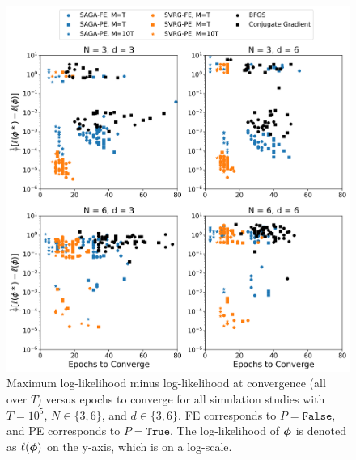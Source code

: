 \begin{figure}[h]
    \centering
    \includegraphics[width=5.5in]{../plt/scatter_sim_T_100000.png}
    \caption{Maximum log-likelihood minus log-likelihood at convergence (all over $T$) versus epochs to converge for all simulation studies with $T=10^{5}$, $N \in \{3,6\}$, and $d \in \{3,6\}$. FE corresponds to $P = \texttt{False}$, and PE corresponds to $P = \texttt{True}$.
    The log-likelihood of $\boldsymbol{\phi}$ is denoted as $\ell(\boldsymbol{\phi})$ on the y-axis, which is on a log-scale. }
    \label{fig:scatter_sim}
\end{figure}

